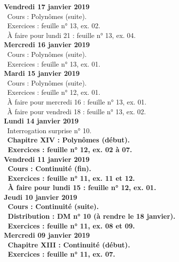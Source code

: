 \documentclass[12pt,a4paper]{article}
\begin{document}
\noindent\textbf{Vendredi 17 janvier 2019}\\
\bu\ Cours : Polynômes (suite).\\
\bu\ Exercices : feuille n° 13, ex. 02.\\
\bu\ À faire pour lundi 21 : feuille n° 13, ex. 04.\vspace{.4cm}\\

\noindent\textbf{Mercredi 16 janvier 2019} \\
\bu\ Cours : Polynômes (suite).\\
\bu\ Exercices : feuille n° 13, ex. 01.\vspace{.4cm}\\

\noindent\textbf{Mardi 15 janvier 2019} \\
\bu\ Cours : Polynômes (suite).\\
\bu\ Exercices : feuille n° 12, ex. 01.\\
\bu\ À faire pour mercredi 16 : feuille n° 13, ex. 01.\\
\bu\ À faire pour vendredi 18 : feuille n° 13, ex. 02.\vspace{.4cm}\\
 
\noindent\textbf{Lundi 14 janvier 2019} \\
\bu\ Interrogation surprise n° 10.\\
\bu\ \bf Chapitre XIV \rm : Polynômes (début).\\
\bu\ Exercices : feuille n° 12, ex. 02 à 07.\vspace{.4cm}\\

\noindent\textbf{Vendredi 11 janvier 2019}\\
\bu\ Cours : Continuité (fin).\\
\bu\ Exercices : feuille n° 11, ex. 11 et 12.\\
\bu\ À faire pour lundi 15 : feuille n° 12, ex. 01.\vspace{.4cm}\\
 
\noindent\textbf{Jeudi 10 janvier 2019}\\
\bu\ Cours : Continuité (suite).\\
\bu\ Distribution : DM n° 10 (à rendre le 18 janvier).\\
\bu\ Exercices : feuille n° 11, ex. 08 et 09.\vspace{.4cm}\\
 
\noindent\textbf{Mercredi 09 janvier 2019} \\
\bu\ \bf Chapitre XIII \rm : Continuité (début).\\
\bu\ Exercices : feuille n° 11, ex. 07.\vspace{.4cm}\\
 
\end{document}

